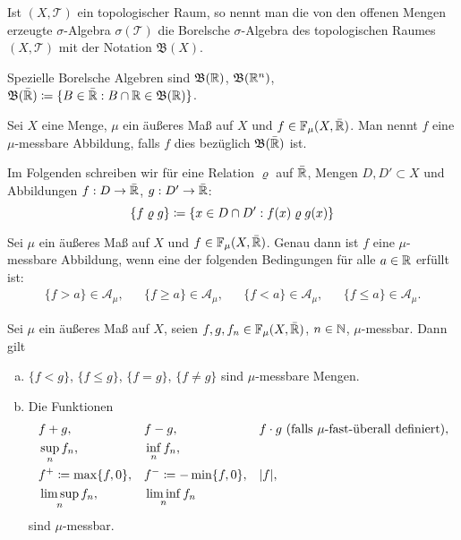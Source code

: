 \documentclass[a4paper,twoside,DIV15,BCOR12mm]{scrbook}
\newcommand{\A}{\mathcal A}
\newcommand{\borel}{\mathfrak B}
\begin{document}
\begin{definition}
Ist $(X,\mathcal T)$ ein topologischer Raum, so nennt man die von den offenen Mengen erzeugte $\sigma$-Algebra $\sigma(\mathcal T)$ die Borelsche $\sigma$-Algebra des topologischen Raumes $(X,\mathcal T)$ mit der Notation $\borel(X)$.

Spezielle Borelsche Algebren sind $\borel(\MdR)$, $\borel(\MdR^n)$, $\borel(\bar\MdR) \da \{B\in \bar\MdR : B\cap \MdR \in \borel(\MdR)\}$.
\end{definition}

\begin{definition}
Sei $X$ eine Menge, $\mu$ ein äußeres Maß auf $X$ und $f\in\mathbb F_\mu(X,\bar{\mathbb{R}})$. Man nennt $f$ eine $\mu$-messbare Abbildung, falls $f$ dies bezüglich $\borel(\bar\MdR)$ ist.
\end{definition}

Im Folgenden schreiben wir für eine Relation $\varrho$ auf $\bar{\mathbb{R}}$, Mengen $D, D'\subset X$ und Abbildungen $f: D\to \bar{\mathbb{R}}$, $g:D'\to\bar{\mathbb{R}}$:
\[
\{ f\mathrel{\varrho} g\} \da \{ x\in D\cap D' : f(x)\mathrel{\varrho} g(x) \}
\]

\begin{lemma}
Sei $\mu$ ein äußeres Maß auf $X$ und $f\in \mathbb F_\mu(X,\bar{\mathbb{R}})$. Genau dann ist $f$ eine $\mu$-messbare Abbildung, wenn eine der folgenden Bedingungen für alle $a\in\mathbb{R}$ erfüllt ist:
\begin{align*}
 \{f > a\} \in \A_\mu, && \{f\ge a\} \in \A_\mu, && \{f<a\} \in \A_\mu, && \{f\le a\}\in\A_\mu.
\end{align*}
\end{lemma}

\begin{lemma}
Sei $\mu$ ein äußeres Maß auf $X$, seien $f,g,f_n\in \mathbb F_\mu(X,\bar{\mathbb{R}})$, $n\in\mathbb{N}$, $\mu$-messbar. Dann gilt
\begin{enumerate}[(a)]
\item $\{f<g\}$, $\{f\le g\}$, $\{f=g\}$, $\{f\ne g\}$ sind $\mu$-messbare Mengen.
\item Die Funktionen
\begin{align*}
&f+ g, && f-g, && f \cdot g \text{ (falls $\mu$-fast-überall definiert)}, \\
&\sup_n f_n, && \inf_n f_n, && \\
&f^+ \da \max\{f,0\}, && f^- \da -\min\{f,0\}, && |f|, \\
&\limsup_n f_n, && \liminf_n f_n
\end{align*}
sind $\mu$-messbar.
\end{enumerate}
\end{lemma}
\end{document}
